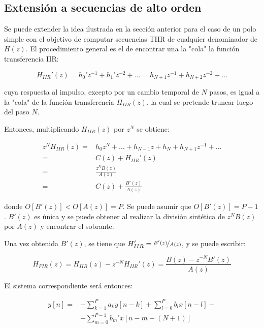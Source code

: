 \subsection{Extensión a secuencias de alto orden}
    Se puede extender la idea ilustrada en la sección anterior para el caso de un polo simple con el objetivo de computar secuencias TIIR de cualquier denominador de $H(z)$. El procedimiento general es el de encontrar una la "cola" la función transferencia IIR:

    \begin{equation}
      H_{IIR}'(z) = h_0' z^{-1} + h_1' z^{-2} + \ldots = h_{N+1} z^{-1} + h_{N+2} z^{-2} + \ldots
    \end{equation}

    cuya respuesta al impulso, excepto por un cambio temporal de $N$ pasos, es igual a la "cola" de la función transferencia $H_{IIR}(z)$, la cual se pretende truncar luego del paso $N$.

    Entonces, multiplicando $H_{IIR}(z)$ por $z^N$ se obtiene:

    \begin{align}
      z^N H_{IIR} (z) =& h_0 z^N + \ldots + h_{N-1}z + h_N + h_{N+1} z^{-1} + \ldots \\
      =& C(z) + H_{IIR}'(z) \\
      =& \frac{z^N B(z)}{A(z)} \\
      =& C(z) + \frac{B'(z)}{A(z)}
    \end{align}

    donde $O[B'(z)] < O[A(z)] = P$. Se puede asumir que $O[B'(z)]=P-1$. $B'(z)$ es única y se puede obtener al realizar la división sintética de $z^N B(z)$ por $A(z)$ y encontrar el sobrante.

    Una vez obtenida $B'(z)$, se tiene que $H_{IIR}' = \nicefrac{B'(z)}{A(z)}$, y se puede escribir:

    \begin{equation}
      H_{FIR}(z) = H_{IIR}(z) - z^{-N} H_{IIR}'(z) = \frac{B(z)-z^{-N}B'(z)}{A(z)}
    \end{equation}

    El sistema correspondiente será entonces:

    \begin{equation}
      \begin{split}
        y[n] =& - \sum_{k=1}^{P}{a_k y[n-k]} + \sum_{l=0}^{P}{b_l x[n-l]}-\\
              & - \sum_{m=0}^{P-1}{b_m ' x[n-m-(N+1)]}
      \end{split}
      \label{eq:25}
    \end{equation}

